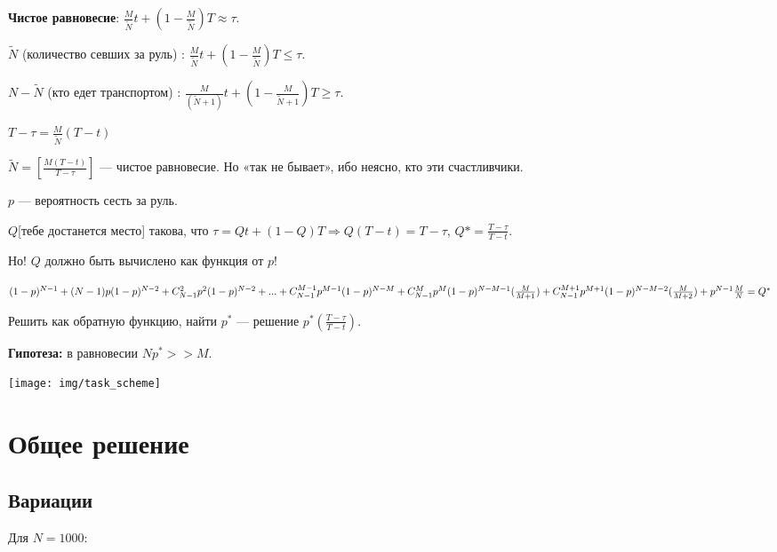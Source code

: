 \textbf{Чистое равновесие}: $\frac{M}{\tilde N}t+(1-\frac{M}{\tilde{N}})T\approx\tau$.


$\tilde{N}$ (количество севших за руль) : $\frac{M}{\tilde{N}}t+(1-\frac{M}{\tilde{N}})T\le\tau$.

${N-\tilde N}$ (кто едет транспортом) : $\frac{M}{(\tilde{N}+1)}t+(1-\frac{M}{\tilde{N}+1})T\ge\tau$.

$T-\tau = \frac{M}{\tilde{N}}(T-t)$

$\tilde{N}=[\frac{M(T-t)}{T-\tau}]$ — чистое равновесие. Но «так не бывает», ибо неясно, кто эти счастливчики.

$p$ — вероятность сесть за руль.

$Q$[тебе достанется место] такова, что $\tau = Qt+(1-Q)T \Rightarrow Q(T-t)=T-\tau$, $Q*=\frac{T-\tau}{T-t}$.

Но! $Q$ должно быть вычислено как функция от $p$!

$(1-p)^{N-1} + \\ (N-1)p(1-p)^{N-2} + \\ C_{N-1}^2 p^2(1-p)^{N-2} + ... + \\ C_{N-1}^{M-1}p^{M-1}(1-p)^{N-M} + \\ C_{N-1}^{M}p^M(1-p)^{N-M-1}(\frac{M}{M+1}) + \\ C_{N-1}^{M+1}p^{M+1}(1-p)^{N-M-2}(\frac{M}{M+2}) + \\ p^{N-1}\frac{M}{N} = \\ Q^*$

Решить как обратную функцию, найти $p^*$ — решение $p^*(\frac{T-\tau}{T-t})$.

\textbf{Гипотеза:} в равновесии $Np^* >> M$.




\bigskip

\texttt{[image: img/task\_scheme]}


\section{Общее решение}


\subsection{Вариации}

Для $N=1000$:


